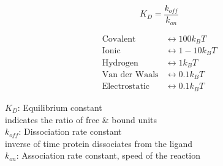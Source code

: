 \begin{minipage}{0.5\linewidth}
    \[
    \boxed{        
            K_D = \frac{k_{off}}{k_{on}}
    }
    \]
\end{minipage}\begin{minipage}{0.4\linewidth}
\begin{align*}
    \text{Covalent} &\longleftrightarrow 100 k_B T\\
    \text{Ionic} &\longleftrightarrow 1-10 k_B T\\
    \text{Hydrogen} &\longleftrightarrow 1 k_B T\\
    \text{Van der Waals} &\longleftrightarrow 0.1 k_B T\\
    \text{Electrostatic} &\longleftrightarrow 0.1 k_B T
\end{align*}
\end{minipage} 

    $K_D$: Equilibrium constant\\
    indicates the ratio of free \& bound units\\
    $k_{off}$: Dissociation rate constant\\
    inverse of time protein dissociates from the ligand\\
    $k_{on}$: Association rate constant, speed of the reaction

